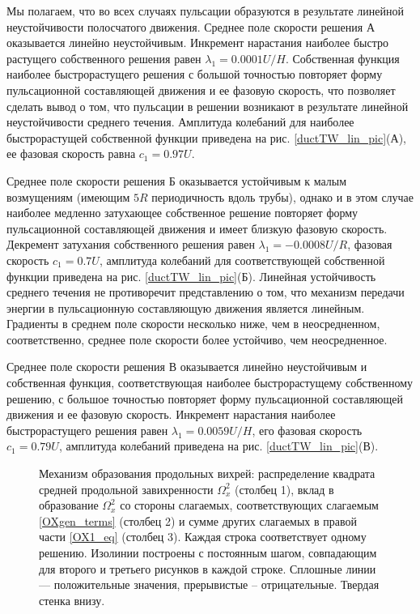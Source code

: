 Мы полагаем, что во всех случаях пульсации образуются в результате линейной неустойчивости полосчатого движения. 
Среднее поле скорости решения А оказывается линейно неустойчивым. Инкремент нарастания наиболее быстро растущего собственного решения равен $\lambda_1 = 0.0001U/H$. Собственная функция наиболее быстрорастущего решения с большой точностью повторяет форму пульсационной составляющей движения и ее фазовую скорость, что позволяет сделать вывод о том, что пульсации в решении возникают в результате линейной неустойчивости среднего течения. Амплитуда колебаний для наиболее быстрорастущей собственной функции приведена на рис. \ref{ductTW_lin_pic}(А), ее фазовая скорость равна $c_1=0.97U$. 

Среднее поле скорости решения Б оказывается устойчивым к малым возмущениям (имеющим $5R$ периодичность вдоль трубы), однако и в этом случае наиболее медленно затухающее собственное решение повторяет форму пульсационной составляющей движения и имеет близкую фазовую скорость. Декремент затухания собственного решения равен $\lambda_1 = -0.0008U/R$, фазовая скорость $c_1 = 0.7U$, амплитуда колебаний для соответствующей собственной функции приведена на рис. \ref{ductTW_lin_pic}(Б). Линейная устойчивость среднего течения не противоречит представлению о том, что механизм передачи энергии в пульсационную составляющую движения является линейным. Градиенты в среднем поле скорости несколько ниже, чем в неосредненном, соответственно, среднее поле скорости более устойчиво, чем неосредненное. 

Среднее поле скорости решения В оказывается линейно неустойчивым и собственная функция, соответствующая наиболее быстрорастущему собственному решению, с большое точностью повторяет форму пульсационной составляющей движения и ее фазовую скорость. Инкремент нарастания наиболее быстрорастущего решения равен $\lambda_1 = 0.0059U/H$, его фазовая скорость $c_1 = 0.79U$, амплитуда колебаний приведена на рис. \ref{ductTW_lin_pic}(В). 

\begin{figure}
\caption{Механизм образования продольных вихрей: распределение квадрата средней продольной завихренности $\Omega_x^2$ (столбец 1), вклад в образование $\Omega_x^2$ со стороны слагаемых, соответствующих слагаемым \eqref{OXgen_terms} (столбец 2) и сумме других слагаемых в правой части \eqref{OX1_eq} (столбец 3). Каждая строка соответствует одному решению. Изолинии построены с постоянным шагом, совпадающим для второго и третьего рисунков в каждой строке. Сплошные линии --- положительные значения, прерывистые -- отрицательные. Твердая стенка внизу.}
\label{ductTW_OXgen_pic}
\end{figure}

